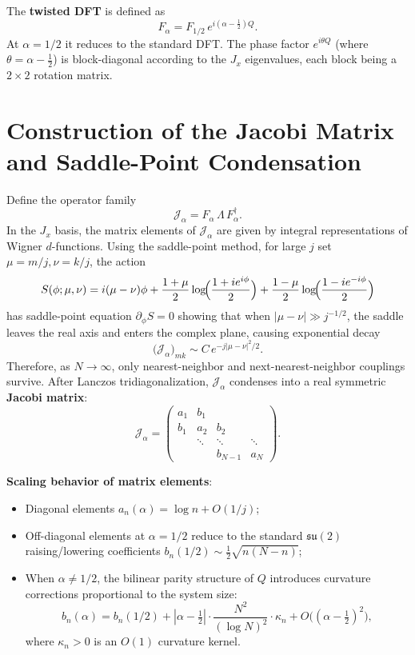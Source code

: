 \documentclass[12pt,a4paper]{amsart}
\theoremstyle{plain}
\theoremstyle{definition}
\theoremstyle{remark}
\begin{document}
The \textbf{twisted DFT} is defined as
\[
F_\alpha=F_{1/2}\,e^{i(\alpha-\frac12)Q}.
\]
At $\alpha=1/2$ it reduces to the standard DFT. The phase factor $e^{i\theta Q}$ (where $\theta=\alpha-\frac12$) is block-diagonal according to the $J_x$ eigenvalues, each block being a $2\times 2$ rotation matrix.

\section{Construction of the Jacobi Matrix and Saddle-Point Condensation}

Define the operator family
\[
\mathcal{J}_\alpha=F_\alpha\,\Lambda\,F_\alpha^\dagger.
\]
In the $J_x$ basis, the matrix elements of $\mathcal{J}_\alpha$ are given by integral representations of Wigner $d$-functions. Using the saddle-point method, for large $j$ set $\mu=m/j,\nu=k/j$, the action
\[
S(\phi;\mu,\nu)=i(\mu-\nu)\phi+\frac{1+\mu}{2}\log\!\Bigl(\frac{1+ie^{i\phi}}{2}\Bigr)+\frac{1-\mu}{2}\log\!\Bigl(\frac{1-ie^{-i\phi}}{2}\Bigr)
\]
has saddle-point equation $\partial_\phi S=0$ showing that when $|\mu-\nu|\gg j^{-1/2}$, the saddle leaves the real axis and enters the complex plane, causing exponential decay
\[
\bigl(\mathcal{J}_\alpha\bigr)_{mk}\sim C\,e^{-j|\mu-\nu|^2/2}.
\]
Therefore, as $N\to\infty$, only nearest-neighbor and next-nearest-neighbor couplings survive. After Lanczos tridiagonalization, $\mathcal{J}_\alpha$ condenses into a real symmetric \textbf{Jacobi matrix}:
\[
\mathcal{J}_\alpha=\begin{pmatrix}
a_1 & b_1 & & \\
b_1 & a_2 & b_2 & \\
& \ddots & \ddots & \ddots \\
& & b_{N-1} & a_N
\end{pmatrix}.
\]

\textbf{Scaling behavior of matrix elements}:
\begin{itemize}
\item Diagonal elements $a_n(\alpha)=\log n+O(1/j)$;
\item Off-diagonal elements at $\alpha=1/2$ reduce to the standard $\mathfrak{su}(2)$ raising/lowering coefficients $b_n(1/2)\sim\frac12\sqrt{n(N-n)}$;
\item When $\alpha\neq 1/2$, the bilinear parity structure of $Q$ introduces curvature corrections proportional to the system size:
\[
b_n(\alpha)=b_n(1/2)+|\alpha-\tfrac12|\cdot\frac{N^2}{(\log N)^2}\cdot\kappa_n+O\bigl((\alpha-\tfrac12)^2\bigr),
\]
where $\kappa_n>0$ is an $O(1)$ curvature kernel.
\end{itemize}
\end{document}
